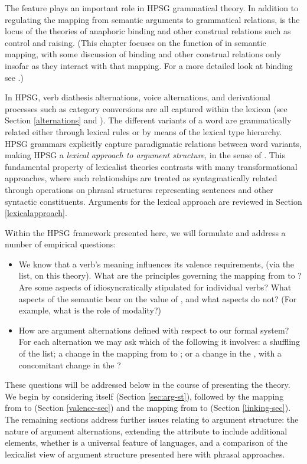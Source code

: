 \documentclass[output=paper]{langsci/langscibook}
\begin{document}
The \argst feature plays an important  
role in HPSG grammatical theory.  In addition to regulating the mapping from semantic arguments to
grammatical relations, \argst is the locus of the theories of anaphoric binding and other construal
relations such as control and raising.  (This chapter focuses on the function of \argst  in semantic
mapping, with some discussion of binding and other construal relations only insofar as they interact
with that mapping.  For a more detailed look at binding see .)   

In HPSG, verb diathesis alternations, voice alternations, and derivational processes such as category conversions are all captured within the lexicon (see Section \ref{alternations} and ).  The different variants of a word are grammatically related either through lexical rules or by means of the lexical type hierarchy.  HPSG grammars explicitly capture paradigmatic relations between word variants, making HPSG a \textit{lexical approach to argument structure}, in the sense of \citet{MWArgSt}.
This fundamental property of lexicalist theories contrasts with many transformational approaches, where such relationships are treated as syntagmatically related through operations on phrasal structures representing sentences and other syntactic constituents.  Arguments for the lexical approach are reviewed in Section \ref{lexicalapproach}.  

Within the HPSG framework presented here, we will formulate and address a number of empirical questions: 

\begin{itemize}
\item We know that a verb's meaning influences its valence requirements, (via the \argst list, on this theory). 
 What are the principles governing the mapping from \content to \argst?  Are some aspects of \argst idiosyncratically stipulated for individual verbs?  What aspects of the semantic \content  bear on the value of \argst, and what aspects do not?  (For example, what is the role of modality?)  
\item How are argument alternations defined with respect to our formal system?  For each alternation we may ask which of the following it involves: a shuffling of the \argst list;  a change in the mapping from \argst to \val; or  a change in the \content, with a concomitant change in the \argst?  
\end{itemize}

\noindent
These questions will be addressed below in the course of presenting the theory.  We begin by considering \argst itself (Section \ref{sec:arg-st}), followed by the mapping from \argst to \val (Section \ref{valence-sec}) and the mapping from \content to \argst (Section \ref{linking-sec}).  
The remaining sections address further issues relating to argument structure: the nature of argument alternations, extending the \argst attribute to include additional elements, whether \argst is a universal feature of languages, and a comparison of the lexicalist view of argument structure presented here with phrasal approaches.
\end{document}
